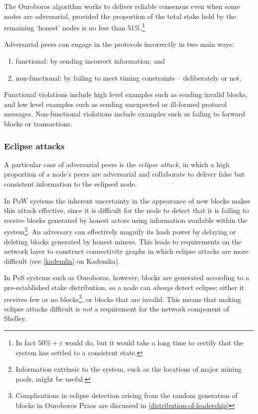 \documentclass[11pt,a4paper]{article}
\begin{document}
The Ouroboros algorithm works to deliver reliable consensus even when
some nodes are adversarial, provided the proportion of the total stake
held by the remaining `honest' nodes is no less than 51\%.\footnote{In
  fact $50\%+\varepsilon$ would do, but it would take a long time to certify that
  the system has settled to a consistent state.}

Adversarial peers can engage in the protocols incorrectly in two main
ways:

\begin{enumerate}
\item
  functional: by sending incorrect information; and
\item
  non-functional: by failing to meet timing constraints -- deliberately
  or not.
\end{enumerate}

Functional violations include high level examples such as sending
invalid blocks, and low level examples such as sending unexpected or
ill-formed protocol messages. Non-functional violations include examples
such as failing to forward blocks or transactions.

\subsubsection{Eclipse attacks}
\label{eclipse-attacks}

A particular case of adversarial peers is the \emph{eclipse attack},
in which a high proportion of a node's peers are adversarial and
collaborate to deliver false but consistent information to the eclipsed
node.

In PoW systems the inherent uncertainty in the appearance of new blocks
makes this attack effective, since it is difficult for the node to
detect that it is failing to receive blocks generated by honest actors
using information available within the system\footnote{Information
  extrinsic to the system, such as the locations of major mining pools,
  might be useful.}. An adversary can effectively magnify its hash power
by delaying or deleting blocks generated by honest miners. This leads to
requirements on the network layer to construct connectivity graphs in
which eclipse attacks are more difficult (see
\cref{kademlia} on Kademlia).

In PoS systems such as Ouroboros, however, blocks are generated
according to a pre-established stake distribution, so a node can
\emph{always} detect eclipse; either it receives few or no
blocks\footnote{Complications in eclipse detection arising from the
  random generation of blocks in Ouroboros Praos are discussed in
  \cref{distribution-of-leadership}}, or
blocks that are invalid. This means that making eclipse attacks
difficult is \emph{not} a requirement for the network component of
Shelley.
\end{document}
